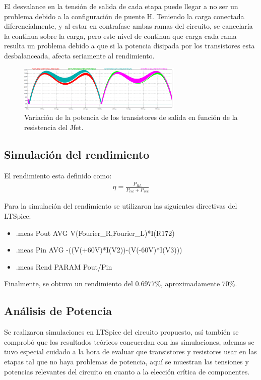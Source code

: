 El desvalance en la tensión de salida de cada etapa puede llegar a no ser un problema debido a la configuración de puente H. Teniendo la carga conectada diferencialmente, y al estar en contrafase ambas ramas del circuito, se cancelaría la continua sobre la carga, pero este nivel de continua que carga cada rama resulta un problema debido a que si la potencia disipada por los transistores esta desbalanceada, afecta seriamente al rendimiento.
 \begin{figure}[H]
\centering
	\includegraphics[width=0.7\textwidth]{ImagenesSimulaciones/DesvalanceP.png}
	\caption{Variación de la potencia de los transistores de salida en función de la resistencia del Jfet.}
	\label{fig:mcPl}
\end{figure} 

\subsection{Simulación del rendimiento}
El rendimiento esta definido como:
\begin{align}
\eta = \frac{P_{RL}}{P_{vcc}+P_{vee}}
\end{align}

Para la simulación del rendimiento se utilizaron las siguientes directivas del LTSpice:

\begin{itemize}
\item .meas Pout AVG V(Fourier_R,Fourier_L)*I(R172)
\item .meas Pin AVG -((V(+60V)*I(V2))-(V(-60V)*I(V3)))
\item .meas Rend PARAM Pout/Pin
\end{itemize}

Finalmente, se obtuvo un rendimiento del $0.6977\%$, aproximadamente $70\%$.

\subsection{Análisis de Potencia}
Se realizaron simulaciones en LTSpice del circuito propuesto, así también se comprobó que los resultados teóricos concuerdan con las simulaciones, ademas se tuvo especial cuidado a la hora de evaluar que transistores y resistores usar en las etapas tal que no haya problemas de potencia, aquí se muestran las tensiones y potencias relevantes del circuito en cuanto a la elección crítica de componentes.

